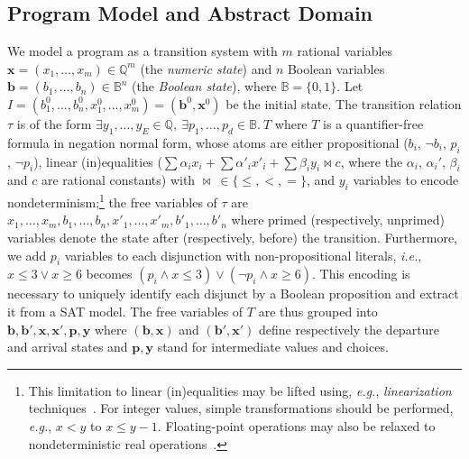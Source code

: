\documentclass{llncs}
\newcommand{\pponly}[1]{}
\newcommand{\rronly}[1]{#1}
\newcommand{\BB}{\mathbb{B}}
\newcommand{\QQ}{\mathbb{Q}}
\newcommand{\ie}{\textit{i.e.}}
\newcommand{\eg}{\textit{e.g.}}
\renewcommand{\vec}[1]{{\boldsymbol #1}}
\begin{document}
\subsection{Program Model and Abstract Domain}
We model a program as a transition system with $m$ rational variables
$\vec{x}\rronly{ = (x_1,\dots,x_m)}\in \QQ^m$ (the \emph{numeric state}) and
$n$ Boolean variables $\vec{b}\rronly{ = (b_1,\dots,b_n) }\in \BB^n$ (the
\emph{Boolean state}), where $\BB = \{0,1\}$.  Let $I =
\rronly{(b_1^0,\dots,b_n^0, x_1^0,\dots,x_m^0) =} (\vec{b}^0, \vec{x}^0)$ be
the initial state.  The transition relation $\tau$ is of the form
$\exists y_1,\dots,y_E \in \QQ,~\exists p_1,\dots,p_d \in \BB.~T$
where $T$ is a quantifier-free formula in negation normal form, whose
atoms are either propositional ($b_i$, $\neg b_i$, $p_i$, $\neg p_i$),
linear (in)equalities ($\sum \alpha_i x_i + \sum \alpha'_i x'_i + \sum
\beta_i y_i \bowtie c$, where the $\alpha_i$, $\alpha_i'$, $\beta_i$
and $c$ are rational constants) with $\bowtie~\in\{\leq,<,=\}$, and
$y_i$ variables to encode nondeterminism\pponly{, e.g. reactive inputs
  or linearization of non-linear arithmetic};\rronly{\footnote{This limitation to linear (in)equalities may be
    lifted using, \eg, \emph{linearization}
    techniques~\cite{Mine_PhD04}.  For integer values, simple
    transformations should be performed, \eg, $x < y$ to $x \leq y-1$.
    Floating-point operations may also be relaxed to nondeterministic
    real operations~\cite[\S4.5]{Monniaux_LMCS10}.}}  the free
variables of $\tau$ are
\pponly{$\vec{x},\vec{x}',\vec{b}$}\rronly{$x_1,\dots,x_m,\allowbreak
  b_1,\dots,b_n, \allowbreak x'_1,\dots,x'_m,\allowbreak
  b'_1,\dots,b'_n$} where primed (respectively, unprimed) variables
denote the state after (respectively, before) the
transition. Furthermore, we add $p_i$ variables to each disjunction
with non-propositional literals, \ie, $x\leq 3 \vee x\geq 6$ becomes $(p_i
\land x\leq 3) \lor (\neg p_i \land x\geq 6)$. This encoding is necessary to
uniquely identify each disjunct by a Boolean proposition and extract
it from a SAT model.  The free variables of $T$ are thus grouped into
$\vec{b},\vec{b}',\vec{x},\vec{x}',\vec{p},\vec{y}$ where
$(\vec{b},\vec{x})$ and $(\vec{b}',\vec{x}')$ define respectively the
departure and arrival states and $\vec{p},\vec{y}$ stand for
intermediate values and choices.
\end{document}
